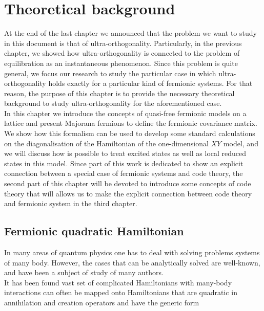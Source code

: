 \chapter{ Theoretical background }
\noindent At the end of the last chapter we announced that the problem we want to study in this document is that of ultra-orthogonality. Particularly, in the previous chapter, we showed how ultra-orthogonality is connected to the problem of equilibration as an instantaneous phenomenon. Since this problem is quite general, we focus our research to study the particular case in which ultra-orthogonality holds exactly for a particular kind of fermionic systems. For that reason, the purpose of this chapter is to provide the necessary theoretical background to study ultra-orthogonality for the aforementioned case.\\

\indent In this chapter we introduce the concepts of quasi-free fermionic models on a lattice and present Majorana fermions to define the fermionic covariance matrix. We show how this formalism can be used to develop some standard calculations on the diagonalisation of the Hamiltonian of the one-dimensional $XY$ model, and we will discuss how is possible to treat excited states as well as local reduced states in this model. Since part of this work is dedicated to show an explicit connection between a special case of fermionic systems and code theory, the second part of this chapter will be devoted to introduce some concepts of code theory that will allows us to make the explicit connection between code theory and fermionic system in the third chapter.

\section{Fermionic quadratic Hamiltonian}
In many areas of quantum physics one has to deal with solving problems systems of many body. However, the cases that can be analytically solved are well-known, and have been a subject of study of many authors\cite{noauthor_density_2007,niu_majorana_2012,reyes-lega_aspects_2016,chung_density-matrix_2001,leijnse_introduction_2012, molinari_notes_2017,botero_bcs-like_2004, bravyi_lagrangian_2004, lieb_two_1961, latorre_ground_2004, katsura_statistical_1962, barouch_statistical_1971, barouch_statistical_1970}.\\

\indent It has been found vast set of complicated Hamiltonians with many-body interactions can often be mapped onto Hamiltonians that are quadratic in annihilation and creation operators and have the generic form \cite{botero_bcs-like_2004}

